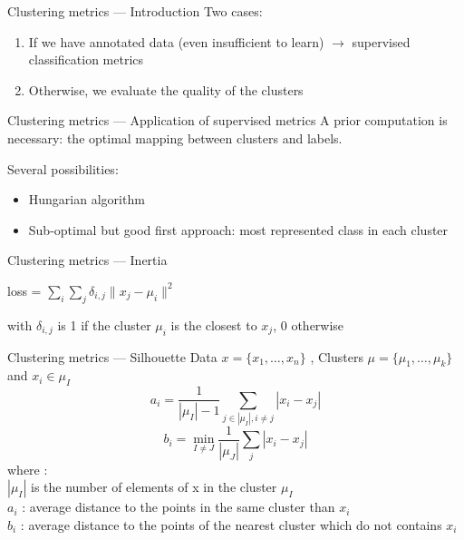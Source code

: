 \begin{frame}{Clustering metrics --- Introduction}
  Two cases:

  \begin{enumerate}
    \item If we have annotated data (even insufficient to learn) $\rightarrow$ supervised classification metrics
    \item Otherwise, we evaluate the quality of the clusters
  \end{enumerate}

\end{frame}

\begin{frame}{Clustering metrics --- Application of supervised metrics}
  A prior computation is necessary: the optimal mapping between clusters and labels.

  Several possibilities:

  \begin{itemize}
    \item Hungarian algorithm
    \item Sub-optimal but good first approach: most represented class in each cluster
  \end{itemize}
\end{frame}

\begin{frame}{Clustering metrics --- Inertia}
  \begin{center}
    loss = $\sum_i \sum_j \delta_{i,j}\lVert x_j - \mu_i \rVert^2$
  \end{center}
  with $\delta_{i,j}$ is 1 if the cluster $\mu_i$ is the closest to $x_j$, 0 otherwise
\end{frame}

\begin{frame}{Clustering metrics --- Silhouette}
  Data $x = \{x_1, \dotsc, x_n\}$ , Clusters $\mu = \{\mu_1, \dotsc, \mu_k\}$ and $x_i\in\mu_I$ \\
  \[
  \boxed{a_i = \frac{1}{|\mu_I|-1}\sum_{j\in|\mu_I|, i \neq j} |x_i - x_j|}
  \]
  \[
  \boxed{b_i = \min_{I \neq J} \frac{1}{|\mu_J|}\sum_j |x_i - x_j|}
  \]
  where : \\
  $|\mu_I|$  is the number of elements of x in the cluster $\mu_I$ \\
  $a_i$ : average distance to the points in the same cluster than $x_i$ \\
  $b_i$ : average distance to the points of the nearest cluster which do not contains $x_i$
  
\end{frame}

